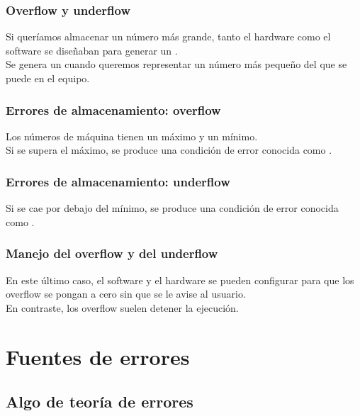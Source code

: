 \documentclass[12pt]{beamer}
\begin{document}
\begin{frame}
\frametitle{Overflow y underflow}
Si queríamos almacenar un número más grande, tanto el hardware como el software se diseñaban para generar un .
\\
\bigskip
\pause
Se genera un  cuando queremos representar un número más pequeño del que se puede en el equipo.
\end{frame}
\begin{frame}
\frametitle{Errores de almacenamiento: overflow}
Los números de máquina tienen un máximo y un mínimo.
\\
\bigskip
Si se supera el máximo, se produce una condición de error conocida como .
\begin{figure}
\centering

\end{figure}
\end{frame}
\begin{frame}
\frametitle{Errores de almacenamiento: underflow}
\begin{figure}
\centering

\end{figure}
Si se cae por debajo del mínimo, se produce una condición de error conocida como .
\end{frame}
\begin{frame}
\frametitle{Manejo del overflow y del underflow}
En este último caso, el software y el hardware se pueden configurar para que los overflow se pongan a cero sin que se le avise al usuario.
\\
\bigskip
\pause
En contraste, los overflow suelen detener la ejecución.
\end{frame}

\section{Fuentes de errores}
\subsection{Algo de teoría de errores}
\end{document}
